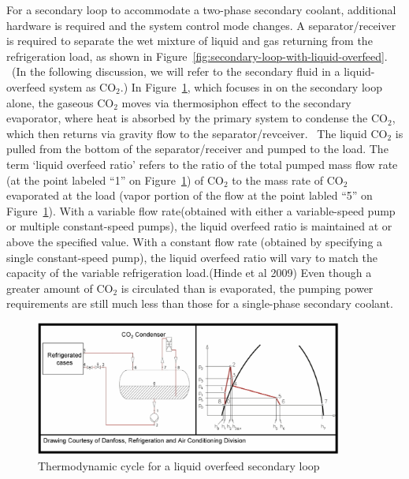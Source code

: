 For a secondary loop to accommodate a two-phase secondary coolant, additional hardware is required and the system control mode changes. A separator/receiver is required to separate the wet mixture of liquid and gas returning from the refrigeration load, as shown in Figure~\ref{fig:secondary-loop-with-liquid-overfeed}. ~(In the following discussion, we will refer to the secondary fluid in a liquid-overfeed system as CO\(_{2}\).) In Figure~\ref{fig:thermodynamic-cycle-for-a-liquid-overfeed}, which focuses in on the secondary loop alone, the gaseous CO\(_{2}\) moves via thermosiphon effect to the secondary evaporator, where heat is absorbed by the primary system to condense the CO\(_{2}\), which then returns via gravity flow to the separator/revceiver.~ The liquid CO\(_{2}\) is pulled from the bottom of the separator/receiver and pumped to the load. The term `liquid overfeed ratio' refers to the ratio of the total pumped mass flow rate (at the point labeled ``1'' on Figure~\ref{fig:thermodynamic-cycle-for-a-liquid-overfeed}) of CO\(_{2}\) to the mass rate of CO\(_{2}\) evaporated at the load (vapor portion of the flow at the point labled ``5'' on Figure~\ref{fig:thermodynamic-cycle-for-a-liquid-overfeed}). With a variable flow rate(obtained with either a variable-speed pump or multiple constant-speed pumps), the liquid overfeed ratio is maintained at or above the specified value. With a constant flow rate (obtained by specifying a single constant-speed pump), the liquid overfeed ratio will vary to match the capacity of the variable refrigeration load.(Hinde et al 2009) Even though a greater amount of CO\(_{2}\) is circulated than is evaporated, the pumping power requirements are still much less than those for a single-phase secondary coolant.

\begin{figure}[hbtp] %
\centering
\includegraphics[width=0.9\textwidth, height=0.9\textheight, keepaspectratio=true]{media/image6325.png}
\caption{Thermodynamic cycle for a liquid overfeed secondary loop \protect \label{fig:thermodynamic-cycle-for-a-liquid-overfeed}}
\end{figure}

